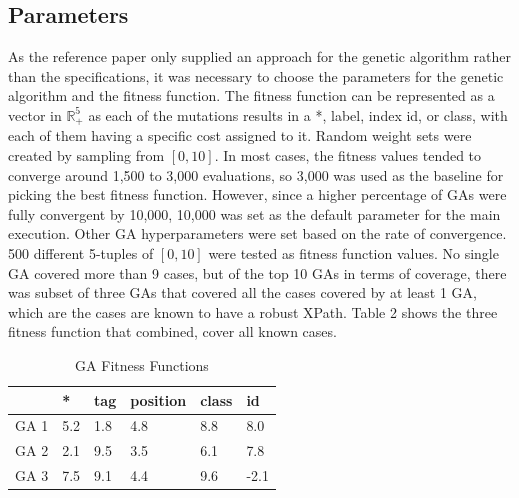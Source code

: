 \documentclass[format=acmlarge, nonacm=true]{acmart}
\begin{document}
\subsection{Parameters}
As the reference paper only supplied an approach for the genetic algorithm rather than the specifications, it was necessary to choose the parameters for the genetic algorithm and the fitness function. The fitness function can be represented as a vector in $\mathbb{R}_+^5$ as each of the mutations results in a *, label, index id, or class, with each of them having a specific cost assigned to it. Random weight sets were created by sampling from $[0,10]$. In most cases, the fitness values tended to converge around 1,500 to 3,000 evaluations, so 3,000 was used as the baseline for picking the best fitness function. However, since a higher percentage of GAs were fully convergent by 10,000, 10,000 was set as the default parameter for the main execution. Other GA hyperparameters were set based on the rate of convergence.\\

500 different 5-tuples of $[0,10]$ were tested as fitness function values. No single GA covered more than 9 cases, but of the top 10 GAs in terms of coverage, there was subset of three GAs that covered all the cases covered by at least 1 GA, which are the cases are known to have a robust XPath. Table 2 shows the three fitness function that combined, cover all known cases.\\

\begin{table}
	\label{tab:cover}
	\caption{GA Fitness Functions}
	\begin{tabular}{l|lllll}
		\toprule
			&	*& tag& position& class& id\\
		\midrule
		GA 1& 5.2& 1.8& 4.8& 8.8& 8.0\\
		GA 2& 2.1& 9.5& 3.5& 6.1& 7.8\\
		GA 3& 7.5& 9.1& 4.4& 9.6& -2.1\\
		\bottomrule
	\end{tabular}
\end{table}
\end{document}
